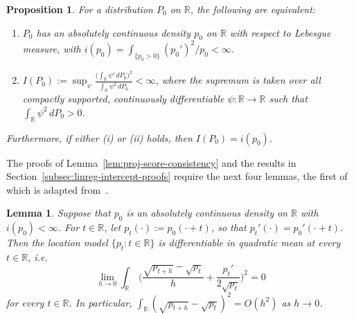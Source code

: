 \documentclass[a4paper]{article}
\newcommand{\R}{\mathbb{R}}
\newtheorem{lemma}[theorem]{Lemma}
\newtheorem{proposition}[theorem]{Proposition}
\theoremstyle{definition}
\begin{document}
\begin{proposition}
\label{prop:fisher-inf-variational}
For a distribution $P_0$ on $\R$, the following are equivalent:
\begin{enumerate}[label=(\roman*)]
\item $P_0$ has an absolutely continuous density $p_0$ on $\R$ with respect to Lebesgue measure, with $i(p_0) = \int_{\{p_0 > 0\}}(p_0')^2/p_0 < \infty$.
\item $I(P_0) := \displaystyle\sup_\psi \frac{\bigl(\int_\R\psi'\,dP_0\bigr)^2}{\int_\R\psi^2\,dP_0} < \infty$,
where the supremum is taken over all compactly supported, continuously differentiable $\psi \colon \R \to \R$ such that $\int_\R\psi^2\,dP_0 > 0$.
\end{enumerate}
Furthermore, if either (i) or (ii) holds, then $I(P_0) = i(p_0)$.
\end{proposition}

The proofs of Lemma~\ref{lem:proj-score-consistency} and the results in Section~\ref{subsec:linreg-intercept-proofs} require the next four lemmas, the first of which is adapted from~\citet[Lemma~7.6 and Example~7.8]{vdV1998asymptotic}.

\begin{lemma}
\label{lem:location-DQM}
Suppose that $p_0$ is an absolutely continuous density on $\R$ with $i(p_0) < \infty$. For $t \in \R$, let $p_t(\cdot) := p_0(\cdot + t)$, so that $p_t'(\cdot) = p_0'(\cdot + t)$. Then the location model $\{p_t : t \in \R\}$ is differentiable in quadratic mean at every $t \in \R$, i.e.
\[
\lim_{h \to 0} \int_\R \,\biggl(\frac{\sqrt{p_{t + h}} - \sqrt{p_t}}{h} + \frac{p_t'}{2\sqrt{p_t}}\biggr)^2 = 0
\]
for every $t \in \R$. In particular, $\int_\R (\sqrt{p_{t + h}} - \sqrt{p_t})^2 = O(h^2)$ as $h \to 0$.
\end{lemma}
\end{document}
